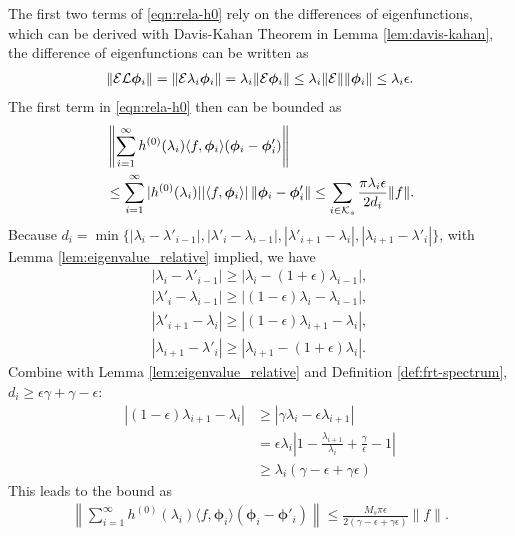 The first two terms of \eqref{eqn:rela-h0} rely on the differences of eigenfunctions, which can be derived with Davis-Kahan Theorem in Lemma \ref{lem:davis-kahan}, the difference of eigenfunctions can be written as
\begin{align}
\| {\mathcal E}{\mathcal L} \bm\phi_i \| =\| {\mathcal E}\lambda_i\bm\phi_i \|=\lambda_i \|{\mathcal E} \bm\phi_i\|\leq\lambda_i\|{\mathcal E}\|\|\bm\phi_i\|\leq \lambda_i \epsilon.
\end{align}
The first term in \eqref{eqn:rela-h0} then can be bounded as
\begin{align}
&\nonumber\left\| \sum_{i=1}^\infty h^{(0)}(\lambda_i )\langle f, \bm\phi_i \rangle (\bm\phi_i - \bm\phi'_i ) \right\|\\
& \leq \sum_{i=1}^\infty |h^{(0)}(\lambda_i)| | \langle f, \bm\phi_i \rangle | \left\|\bm\phi_i-\bm\phi'_i \right\| \leq \sum_{i\in{\ensuremath{\mathcal K}}_s} \frac{\pi\lambda_i \epsilon}{2d_i}  \|f\|.
\end{align} 
Because $d_i=\min\{ |\lambda_i-\lambda'_{i-1}|, |\lambda'_i-\lambda_{i-1}|, |\lambda'_{i+1}-\lambda_i| , | \lambda_{i+1}-\lambda'_i|\}$, with Lemma \ref{lem:eigenvalue_relative} implied, we have
\begin{gather}
|\lambda_i-\lambda'_{i-1}|\geq | \lambda_i - (1+\epsilon)\lambda_{i-1}|,\\
 |\lambda'_i-\lambda_{i-1}|\geq |(1-\epsilon)\lambda_i-\lambda_{i-1}|,\\ |\lambda'_{i+1}-\lambda_i|\geq | (1-\epsilon)\lambda_{i+1}-\lambda_i|,\\| \lambda_{i+1}-\lambda'_i|\geq |\lambda_{i+1}-(1+\epsilon)\lambda_i|.
\end{gather}
Combine with Lemma \ref{lem:eigenvalue_relative} and Definition \ref{def:frt-spectrum}, $d_i\geq \epsilon\gamma +\gamma-\epsilon$:
\begin{align}
 |(1-\epsilon)\lambda_{i+1}-\lambda_i|
 &\geq |\gamma \lambda_i-\epsilon \lambda_{i+1}|\\
 &=\epsilon \lambda_i\left|1-\frac{\lambda_{i+1}}{\lambda_i}+\frac{\gamma}{\epsilon}-1\right|\\&\geq \lambda_i(\gamma-\epsilon+\gamma\epsilon)
\end{align}
This leads to the bound as
\begin{align}
\left\| \sum_{i=1}^\infty h^{(0)}(\lambda_i )\langle f, \bm\phi_i \rangle (\bm\phi_i - \bm\phi'_i ) \right\| \leq   \frac{M_s \pi \epsilon}{2(\gamma-\epsilon+\gamma\epsilon)} \|f\|.
\end{align}


